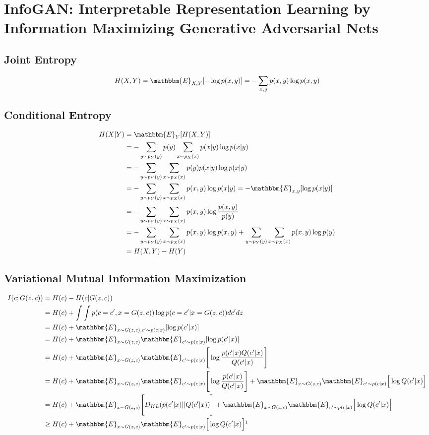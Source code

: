 \section{InfoGAN: Interpretable Representation Learning by Information Maximizing Generative Adversarial Nets}
\label{sec:q}

\subsection{Joint Entropy}
\begin{align*}
H(X,Y) = \mathbbm{E}_{X,Y}[-\log p(x,y)] = -\sum_{x,y}p(x,y)\log p(x,y)
\end{align*}
\subsection{Conditional Entropy}
\begin{align*}
H(X|Y) &= \mathbbm{E}_{Y}[H(X,Y)] \\
&= -\sum_{y\sim p_Y(y)}p(y)\sum_{x\sim p_X(x)}p(x|y)\log p(x|y)\\
& = -\sum_{y\sim p_Y(y)}\sum_{x\sim p_X(x)}p(y)p(x|y)\log p(x|y)\\
& = -\sum_{y\sim p_Y(y)}\sum_{x\sim p_X(x)}p(x,y)\log p(x|y) = -\mathbbm{E}_{x,y}[\log p(x|y)]\\
& = -\sum_{y\sim p_Y(y)}\sum_{x\sim p_X(x)}p(x,y)\log \frac{p(x,y)}{p(y)}\\
& = -\sum_{y\sim p_Y(y)}\sum_{x\sim p_X(x)}p(x,y)\log p(x,y) + \sum_{y\sim p_Y(y)}\sum_{x\sim p_X(x)}p(x,y)\log p(y)\\
& = H(X,Y) - H(Y)
\end{align*}
\subsection{Variational Mutual Information Maximization}
\begin{align*}
I(c;G(z,c)) &= H(c) - H(c|G(z,c))\\
& = H(c) + \int\int p(c=c',x=G(z,c))\log p(c=c'|x=G(z,c)) dc' dz\\
& = H(c) + \mathbbm{E}_{x\sim G(z,c),c'\sim p(c|x)}[\log p(c'|x)]\\
& = H(c) + \mathbbm{E}_{x\sim G(z,c)}\mathbbm{E}_{c'\sim p(c|x)}[\log p(c'|x)]\\
& = H(c) + \mathbbm{E}_{x\sim G(z,c)}\mathbbm{E}_{c'\sim p(c|x)}\Bigg[\log \frac{p(c'|x)Q(c'|x)}{Q(c'|x)}\Bigg]\\
& = H(c) + \mathbbm{E}_{x\sim G(z,c)}\mathbbm{E}_{c'\sim p(c|x)}\Bigg[\log \frac{p(c'|x)}{Q(c'|x)}\Bigg] + \mathbbm{E}_{x\sim G(z,c)}\mathbbm{E}_{c'\sim p(c|x)}\Big[\log Q(c'|x)\Big]\\
& = H(c) + \mathbbm{E}_{x\sim G(z,c)}\Bigg[D_{KL}(p(c'|x)||Q(c'|x))\Bigg] + \mathbbm{E}_{x\sim G(z,c)}\mathbbm{E}_{c'\sim p(c|x)}\Big[\log Q(c'|x)\Big]\\
& \geq H(c) + \mathbbm{E}_{x\sim G(z,c)}\mathbbm{E}_{c'\sim p(c|x)}\Big[\log Q(c'|x)\Big] \footnotemark
\end{align*}


